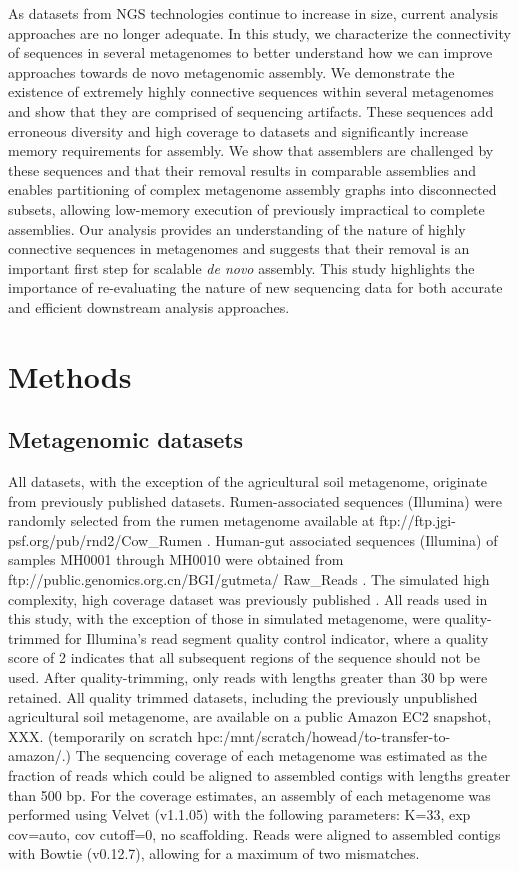 \documentclass[10pt]{article}
\begin{document}
As datasets from NGS technologies continue to increase in size, current analysis approaches are no longer adequate.  In this study, we characterize the connectivity of sequences in several metagenomes to better understand how we can improve approaches towards {de novo} metagenomic assembly.  We demonstrate the existence of extremely highly connective sequences within several metagenomes and show that they are comprised of sequencing artifacts.  These sequences add erroneous diversity and high coverage to datasets and significantly increase memory requirements for assembly.  We show that assemblers are challenged by these sequences and that their removal results in comparable assemblies and enables partitioning of complex metagenome assembly graphs into disconnected subsets, allowing low-memory execution of previously impractical to complete assemblies.  Our analysis provides an understanding of the nature of highly connective sequences in metagenomes and suggests that their removal is an important first step for scalable \emph{de novo} assembly.  This study highlights the importance of re-evaluating the nature of new sequencing data for both accurate and efficient downstream analysis approaches. 

\section*{Methods}

\subsection*{Metagenomic datasets}
All datasets, with the exception of the agricultural soil metagenome, originate from previously published datasets. Rumen-associated sequences (Illumina) were randomly selected from the rumen metagenome available at ftp://ftp.jgi-psf.org/pub/rnd2/Cow\_Rumen \cite{Hess:2011p686}. Human-gut associated sequences (Illumina) of samples MH0001 through MH0010 were obtained from 
ftp://public.genomics.org.cn/BGI/gutmeta/ Raw\_Reads \cite{Qin:2010p189}.  The simulated high complexity, high coverage dataset was previously published \cite{Pignatelli:2011p742}.  All reads used in this study, with the exception of those in simulated metagenome, were quality-trimmed for Illumina's read segment quality control indicator, where a quality score of 2 indicates that all subsequent regions of the sequence should not be used. After quality-trimming, only reads with lengths greater than 30 bp were retained. All quality trimmed datasets, including the previously unpublished agricultural soil metagenome, are available on a public Amazon EC2 snapshot, XXX. (temporarily on scratch hpc:/mnt/scratch/howead/to-transfer-to-amazon/.)  The sequencing coverage of each metagenome was estimated as the fraction of reads which could be aligned to assembled contigs with lengths greater than 500 bp.  For the coverage estimates, an assembly of each metagenome was performed using Velvet (v1.1.05) with the following parameters:  K=33, exp cov=auto, cov cutoff=0, no scaffolding.  Reads were aligned to assembled contigs with Bowtie (v0.12.7), allowing for a maximum of two mismatches.  
\end{document}
